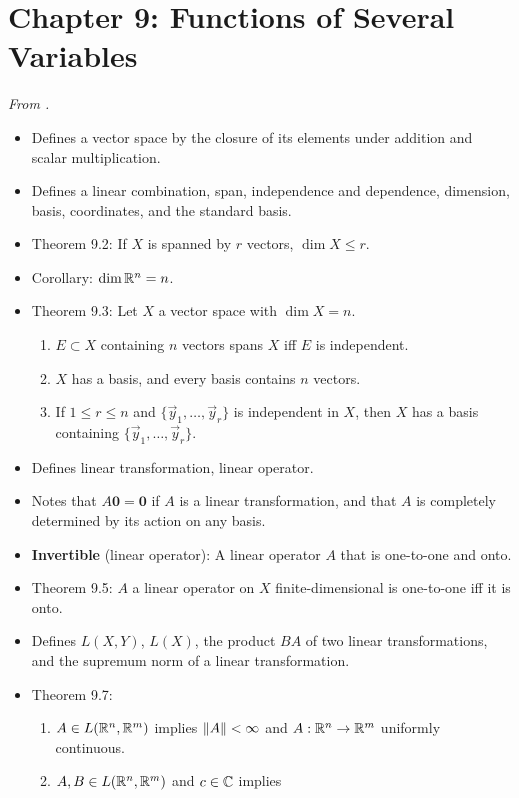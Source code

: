 \documentclass[../notes.tex]{subfiles}
\begin{document}
\section{Chapter 9: Functions of Several Variables}
\emph{From \textcite{bib:Rudin}.}
\begin{itemize}
    \item {}Defines a vector space by the closure of its elements under addition and scalar multiplication.
    \item Defines a linear combination, span, independence and dependence, dimension, basis, coordinates, and the standard basis.
    \item Theorem 9.2: If $X$ is spanned by $r$ vectors, $\dim X\leq r$.
    \item Corollary: $\dim\mathbb{R}^n=n$.
    \item Theorem 9.3: Let $X$ a vector space with $\dim X=n$.
    \begin{enumerate}[label={(\alph*)}]
        \item $E\subset X$ containing $n$ vectors spans $X$ iff $E$ is independent.
        \item $X$ has a basis, and every basis contains $n$ vectors.
        \item If $1\leq r\leq n$ and $\{\vec{y}_1,\dots,\vec{y}_r\}$ is independent in $X$, then $X$ has a basis containing $\{\vec{y}_1,\dots,\vec{y}_r\}$.
    \end{enumerate}
    \item Defines linear transformation, linear operator.
    \item Notes that $A\bm{0}=\bm{0}$ if $A$ is a linear transformation, and that $A$ is completely determined by its action on any basis.
    \item \textbf{Invertible} (linear operator): A linear operator $A$ that is one-to-one and onto.
    \item Theorem 9.5: $A$ a linear operator on $X$ finite-dimensional is one-to-one iff it is onto.
    \item Defines $L(X,Y)$, $L(X)$, the product $BA$ of two linear transformations, and the supremum norm of a linear transformation.
    \item Theorem 9.7:
    \begin{enumerate}[label={(\alph*)}]
        \item $A\in L(\mathbb{R}^n,\mathbb{R}^m)$ implies $\norm{A}<\infty$ and $A:\mathbb{R}^n\to\mathbb{R}^m$ uniformly continuous.
        \item $A,B\in L(\mathbb{R}^n,\mathbb{R}^m)$ and $c\in\mathbb{C}$ implies

\end{enumerate}
\end{itemize}
\end{document}
